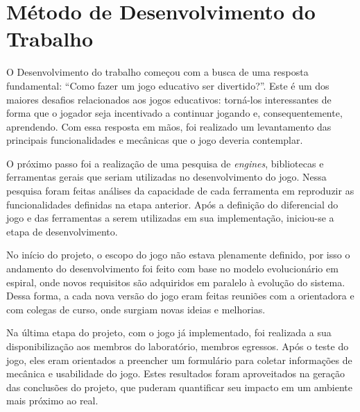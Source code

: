 


\section{Método de Desenvolvimento do Trabalho}
\label{sec-intro-met}
O Desenvolvimento do trabalho começou com a busca de uma resposta fundamental: ``Como fazer um jogo educativo ser divertido?''. Este é um dos maiores desafios relacionados aos jogos educativos: torná-los interessantes de forma que o jogador seja incentivado a continuar jogando e, consequentemente, aprendendo. Com essa resposta em mãos, foi realizado um levantamento das principais funcionalidades e mecânicas que o jogo deveria contemplar.

O próximo passo foi a realização de uma pesquisa de \textit{engines}, bibliotecas e ferramentas gerais que seriam utilizadas no desenvolvimento do jogo. Nessa pesquisa foram feitas análises da capacidade de cada ferramenta em reproduzir as funcionalidades definidas na etapa anterior. Após a definição do diferencial do jogo e das ferramentas a serem utilizadas em sua implementação, iniciou-se a etapa de desenvolvimento.

No início do projeto, o escopo do jogo não estava plenamente definido, por isso o andamento do desenvolvimento foi feito com base no modelo evolucionário em espiral, onde novos requisitos são adquiridos em paralelo à evolução do sistema. Dessa forma, a cada nova versão do jogo eram feitas reuniões com a orientadora e com colegas de curso, onde surgiam novas ideias e melhorias.

Na última etapa do projeto, com o jogo já implementado, foi realizada a sua disponibilização aos membros do laboratório, membros egressos. Após o teste do jogo, eles eram orientados a preencher um formulário para coletar informações de mecânica e usabilidade do jogo. Estes resultados foram aproveitados na geração das conclusões do projeto, que puderam quantificar seu impacto em um ambiente mais próximo ao real.




